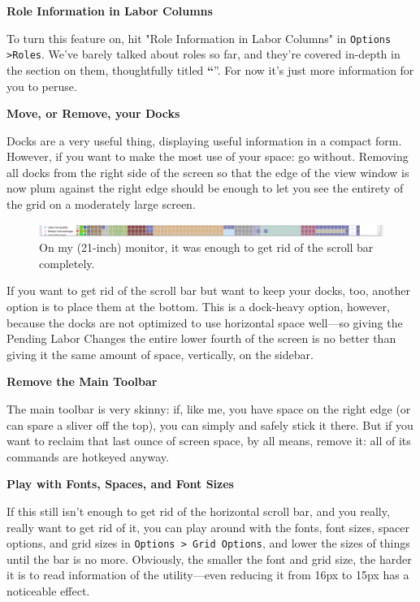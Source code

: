 \documentclass[]{article}
\newcommand{\jump}[1] {\textbf{``\nameref{sec:#1}}''}
\begin{document}
\noindent \textbf{Role Information in Labor Columns}

To turn this feature on, hit "Role Information in Labor Columns" in \texttt{Options >Roles}. We've barely
talked about roles so far, and they're covered in-depth in the section on them, thoughtfully titled
\jump{Roles}. For now it's just more information for you to peruse.\
\vspace{12pt}

\noindent \textbf{Move, or Remove, your Docks}

Docks are a very useful thing, displaying useful information in a compact form. However, if you want to
make the most use of your space: go without. Removing all docks from the right side of the screen so that
the edge of the view window is now plum against the right edge should be enough to let you see the
entirety of the grid on a moderately large screen.
\begin{figure}[h!] \centering
\vspace{-5pt}
\includegraphics[width=\linewidth]{Sec2Fig26}
\caption{On my (21-inch) monitor, it was enough to get rid of the scroll bar completely.}
\vspace{-5pt}
\end{figure}

If you want to get rid of the scroll bar but want to keep your docks, too, another option is to place
them at the bottom. This is a dock-heavy option, however, because the docks are not optimized to use
horizontal space well---so giving the Pending Labor Changes the entire lower fourth of the screen is no
better than giving it the same amount of space, vertically, on the sidebar.
\vspace{12pt}

\noindent \textbf{Remove the Main Toolbar}

The main toolbar is very skinny: if, like me, you have space on the right edge (or can spare a sliver
off the top), you can simply and safely stick it there. But if you want to reclaim that last ounce of
screen space, by all means, remove it: all of its commands are hotkeyed anyway.
\vspace{12pt}

\noindent \textbf{Play with Fonts, Spaces, and Font Sizes}

If this still isn't enough to get rid of the horizontal scroll bar, and you really, really want to get
rid of it, you can play around with the fonts, font sizes, spacer options, and grid sizes in
\texttt{Options > Grid Options}, and lower the sizes of things until the bar is no more. Obviously, the
smaller the font and grid size, the harder it is to read information of the utility---even reducing it
from 16px to 15px has a noticeable effect.
\vspace{12pt}
\end{document}
